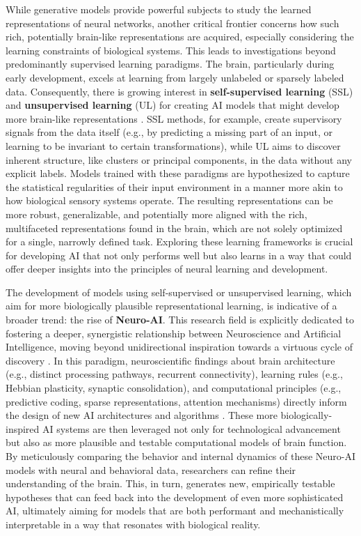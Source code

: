 While generative models provide powerful subjects to study the learned representations of neural networks, another critical frontier concerns how such rich, potentially brain-like representations are acquired, especially considering the learning constraints of biological systems. This leads to investigations beyond predominantly supervised learning paradigms. The brain, particularly during early development, excels at learning from largely unlabeled or sparsely labeled data. Consequently, there is growing interest in \textbf{self-supervised learning} (SSL) and \textbf{unsupervised learning} (UL) for creating AI models that might develop more brain-like representations \cite{richards2019deep}. SSL methods, for example, create supervisory signals from the data itself (e.g., by predicting a missing part of an input, or learning to be invariant to certain transformations), while UL aims to discover inherent structure, like clusters or principal components, in the data without any explicit labels. Models trained with these paradigms are hypothesized to capture the statistical regularities of their input environment in a manner more akin to how biological sensory systems operate. The resulting representations can be more robust, generalizable, and potentially more aligned with the rich, multifaceted representations found in the brain, which are not solely optimized for a single, narrowly defined task. Exploring these learning frameworks is crucial for developing AI that not only performs well but also learns in a way that could offer deeper insights into the principles of neural learning and development.

The development of models using self-supervised or unsupervised learning, which aim for more biologically plausible representational learning, is indicative of a broader trend: the rise of \textbf{Neuro-AI}. This research field is explicitly dedicated to fostering a deeper, synergistic relationship between Neuroscience and Artificial Intelligence, moving beyond unidirectional inspiration towards a virtuous cycle of discovery \cite{richards2019deep, kriegeskorte2018cognitive}. In this paradigm, neuroscientific findings about brain architecture (e.g., distinct processing pathways, recurrent connectivity), learning rules (e.g., Hebbian plasticity, synaptic consolidation), and computational principles (e.g., predictive coding, sparse representations, attention mechanisms) directly inform the design of new AI architectures and algorithms \cite{sun2021bursting}. These more biologically-inspired AI systems are then leveraged not only for technological advancement but also as more plausible and testable computational models of brain function. By meticulously comparing the behavior and internal dynamics of these Neuro-AI models with neural and behavioral data, researchers can refine their understanding of the brain. This, in turn, generates new, empirically testable hypotheses that can feed back into the development of even more sophisticated AI, ultimately aiming for models that are both performant and mechanistically interpretable in a way that resonates with biological reality.

